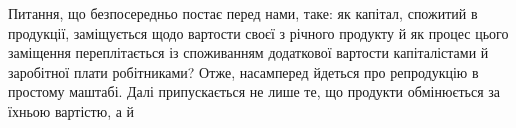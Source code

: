 Питання, що безпосередньо постає перед нами, таке: як капітал,
спожитий в продукції, заміщується щодо вартости своєї з річного продукту
й як процес цього заміщення переплітається із споживанням додаткової
вартости капіталістами й заробітної плати робітниками? Отже,
насамперед йдеться про репродукцію в простому маштабі. Далі припускається
не лише те, що продукти обмінюється за їхньою вартістю, а й
\parbreak{}  %
